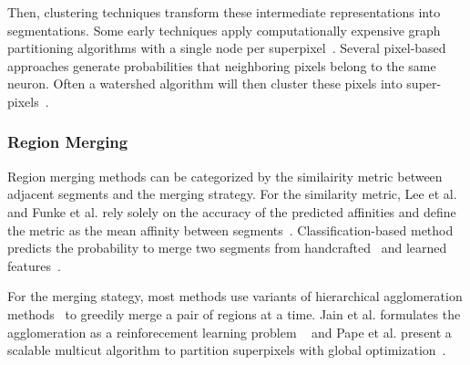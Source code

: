 Then, clustering techniques transform these intermediate representations into segmentations.
Some early techniques apply computationally expensive graph partitioning algorithms with a single node per superpixel~\cite{andres2012globally}.
Several pixel-based approaches generate probabilities that neighboring pixels belong to the same neuron.
Often a watershed algorithm will then cluster these pixels into super-pixels~\cite{zlateski2015image}.

\subsubsection{Region Merging}
Region merging methods can be categorized by the similairity metric between adjacent segments and the merging strategy.
For the similarity metric, Lee et al. and Funke et al. rely solely on the accuracy of the predicted affinities and define the metric as the mean affinity between segments~\cite{lee2017superhuman,funke2017deep}.
Classification-based method predicts the probability to merge two segments from handcrafted~\cite{seymour2016rhoananet,nunez2014graph,parag2017anisotropic,zlateski2015image,10.1371/journal.pone.0125825,jain2011learning} and learned features~\cite{bogovic2013learned}. 

For the merging stategy, most methods use variants of hierarchical agglomeration methods~\cite{seymour2016rhoananet,nunez2014graph,parag2017anisotropic,zlateski2015image,10.1371/journal.pone.0125825,bogovic2013learned} to greedily merge a pair of regions at a time.
Jain et al. formulates the agglomeration as a reinforecement learning problem ~\cite{jain2011learning} and Pape et al. present a scalable multicut algorithm to partition superpixels with global optimization~\cite{beier2017multicut}.


